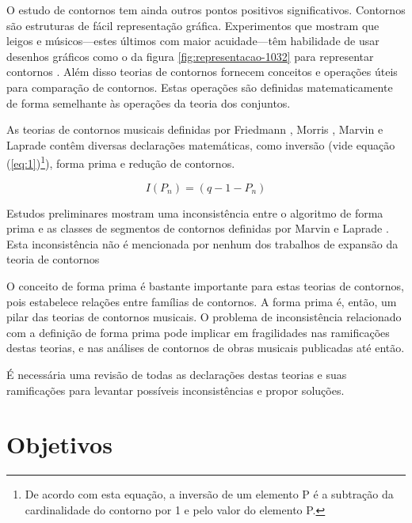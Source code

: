 \documentclass[12pt]{article}
\begin{document}
O estudo de contornos tem ainda outros pontos positivos
significativos. Contornos são estruturas de fácil representação
gráfica. Experimentos que mostram que leigos e músicos---estes últimos
com maior acuidade---têm habilidade de usar desenhos gráficos como o
da figura \ref{fig:representacao-1032} para representar contornos
\cite[p. 69]{marvin88:generalized}. Além disso teorias de contornos
fornecem conceitos e operações úteis para comparação de
contornos. Estas operações são definidas matematicamente de forma
semelhante às operações da teoria dos conjuntos.

As teorias de contornos musicais definidas por Friedmann
\cite{friedmann85:methodology}, Morris
\cite{morris87:composition,morris93:directions}, Marvin e Laprade
\cite{marvin.ea87:relating,marvin88:generalized} contêm diversas
declarações matemáticas, como inversão (vide equação
(\ref{eq:1})\footnote{De acordo com esta equação, a inversão de um
  elemento P é a subtração da cardinalidade do contorno por 1 e pelo
  valor do elemento P.}), forma prima e redução de contornos.

\begin{equation}
  \label{eq:1}
  I(P_n) = (q − 1 − P_n)
\end{equation}

Estudos preliminares mostram uma inconsistência entre o algoritmo de
forma prima e as classes de segmentos de contornos definidas por
Marvin e Laprade \cite{marvin.ea87:relating}. Esta inconsistência não
é mencionada por nenhum dos trabalhos de expansão da teoria de
contornos
\cite{polansky.ea92:possible,clifford95:contour,quinn97:fuzzy,beard03:contour,bor09:contour,schultz08:melodic,schultz09:diachronic}

O conceito de forma prima é bastante importante para estas teorias de
contornos, pois estabelece relações entre famílias de contornos. A
forma prima é, então, um pilar das teorias de contornos musicais. O
problema de inconsistência relacionado com a definição de forma prima
pode implicar em fragilidades nas ramificações destas teorias, e nas
análises de contornos de obras musicais publicadas até então.

É necessária uma revisão de todas as declarações destas teorias e suas
ramificações para levantar possíveis inconsistências e propor soluções.

\section{Objetivos}
\label{sec:objetivos}
\end{document}
